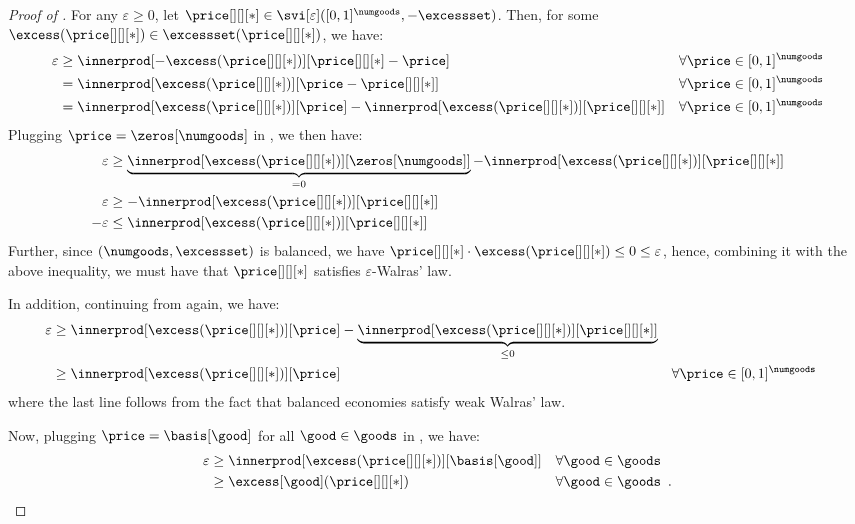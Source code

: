 \lemmaapproxsvieqapproxwe*
\begin{proof}[Proof of ]
    For any $\varepsilon \geq 0$, let $\price[][][*] \in \svi[\varepsilon]([0, 1]^\numgoods, -\excessset)$. Then, for some $\excess(\price[][][*]) \in \excessset(\price[][][*])$, we have:
    \begin{align}
        \varepsilon &\geq \innerprod[{-\excess(\price[][][*])}][{\price[][][*] - \price}] && \forall \price \in [0, 1]^\numgoods \notag\\
        &= \innerprod[{\excess(\price[][][*])}][{\price - \price[][][*]}] && \forall \price \in [0, 1]^\numgoods \notag\\
        &= \innerprod[{\excess(\price[][][*])}][{\price}] - \innerprod[{\excess(\price[][][*])}][{\price[][][*] }] && \forall \price \in [0, 1]^\numgoods \label{eq:we_svi_eq_left1}
    \end{align}
    Plugging $\price = \zeros[\numgoods]$ in , we then have: 
    \begin{align*}
        \varepsilon &\geq \underbrace{\innerprod[{\excess(\price[][][*])}][{\zeros[\numgoods]}]}_{= 0} - \innerprod[{\excess(\price[][][*])}][{\price[][][*] }]\\
        \varepsilon &\geq -  \innerprod[{\excess(\price[][][*])}][{\price[][][*]}]\\
        -\varepsilon &\leq \innerprod[{\excess(\price[][][*])}][{\price[][][*]}]
    \end{align*}
    Further, since $(\numgoods, \excessset)$ is balanced, we have $\price[][][*] \cdot \excess(\price[][][*]) \leq 0 \leq \varepsilon$, hence, combining it with the above inequality, we must have that $\price[][][*]$ satisfies $\varepsilon$-Walras' law.

    In addition, continuing from  again, we have:
    \begin{align}
        \varepsilon &\geq \innerprod[{\excess(\price[][][*])}][{\price}] - \underbrace{\innerprod[{\excess(\price[][][*])}][{\price[][][*] }]}_{\leq 0} \notag\\
        &\geq \innerprod[{\excess(\price[][][*])}][{\price}] && \forall \price \in [0, 1]^\numgoods \label{eq:weak_walras_law_application2}
    \end{align}
     where the last line follows from the fact that balanced economies satisfy weak Walras' law.

    Now, plugging $\price = \basis[\good]$ for all $\good \in \goods$ in , we have:
    \begin{align*}
        \varepsilon &\geq \innerprod[{\excess(\price[][][*])}][{\basis[\good]}] && \forall \good \in \goods \notag\\
        &\geq \excess[\good](\price[][][*]) && \forall \good \in \goods \notag \enspace .
    \end{align*}


\end{proof}
